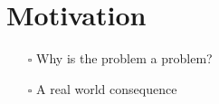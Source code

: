 




\section{Motivation}

\begin{itemize}
\item[$\square$] Why is the problem a problem?
\item[$\square$] A real world consequence
\end{itemize}

